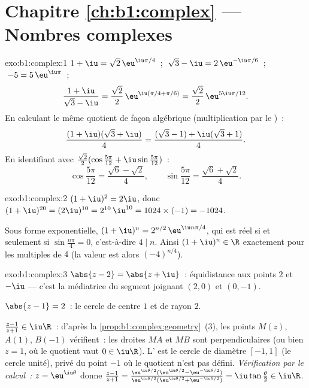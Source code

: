 \section*{Chapitre \ref{ch:b1:complex} --- Nombres complexes}

\begin{solution}{exo:b1:complex:1}
$1 + \iu = \sqrt 2\, \eu^{\iu\pi/4}$~;
$\;\sqrt 3 - \iu = 2\, \eu^{-\iu\pi/6}$~;
$\;-5 = 5\, \eu^{\iu\pi}$~;
\[
\frac{1 + \iu}{\sqrt 3 - \iu}
= \frac{\sqrt 2}{2}\, \eu^{\iu(\pi/4 + \pi/6)}
= \frac{\sqrt 2}{2}\, \eu^{5\iu\pi/12}.
\]
En calculant le même quotient de façon algébrique (multiplication par
le )~:
\[
\frac{(1 + \iu)(\sqrt 3 + \iu)}{4}
= \frac{(\sqrt 3 - 1) + \iu(\sqrt 3 + 1)}{4}.
\]
En identifiant avec $\frac{\sqrt 2}{2}(\cos\frac{5\pi}{12} +
\iu\sin\frac{5\pi}{12})$~:
\[
\cos\frac{5\pi}{12} = \frac{\sqrt 6 - \sqrt 2}{4},
\qquad
\sin\frac{5\pi}{12} = \frac{\sqrt 6 + \sqrt 2}{4}.
\]
\end{solution}

\begin{solution}{exo:b1:complex:2}
$(1+\iu)^2 = 2\iu$, donc $(1+\iu)^{20} = (2\iu)^{10} = 2^{10}\,\iu^{10}
= 1024 \times (-1) = -1024$.

Sous forme exponentielle, $(1+\iu)^n = 2^{n/2}\, \eu^{\iu n\pi/4}$, qui
est réel si et seulement si $\sin\frac{n\pi}{4} = 0$, c'est-à-dire $4
\mid n$. Ainsi $(1+\iu)^n \in \R$ exactement pour les multiples de $4$
(la valeur est alors $(-4)^{n/4}$).
\end{solution}

\begin{solution}{exo:b1:complex:3}
$\abs{z - 2} = \abs{z + \iu}$~: équidistance aux points $2$ et $-\iu$
--- c'est la médiatrice du segment joignant $(2, 0)$ et $(0, -1)$.

$\abs{z - 1} = 2$~: le cercle de centre $1$ et de rayon $2$.

$\frac{z-1}{z+1} \in \iu\R$~: d'après la
\cref{prop:b1:complex:geometry}~(3), les points $M(z)$, $A(1)$,
$B(-1)$ vérifient~: les droites $MA$ et $MB$ sont perpendiculaires (ou
bien $z = 1$, où le quotient vaut $0 \in \iu\R$). L' est le
cercle de diamètre $[-1, 1]$ (le cercle unité), privé du point $-1$ où
le quotient n'est pas défini. \emph{Vérification par le calcul~:} $z =
\eu^{\iu\theta}$ donne $\frac{z-1}{z+1} =
\frac{\eu^{\iu\theta/2}(\eu^{\iu\theta/2} -
\eu^{-\iu\theta/2})}{\eu^{\iu\theta/2}(\eu^{\iu\theta/2} +
\eu^{-\iu\theta/2})} = \iu\tan\frac\theta2 \in \iu\R$.
\end{solution}

